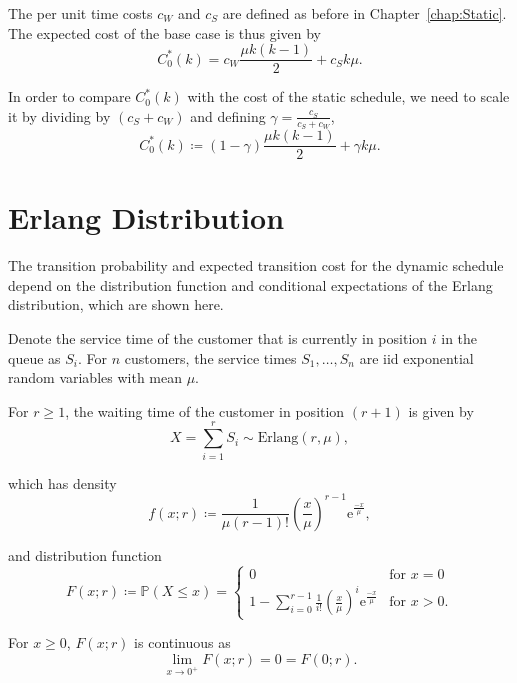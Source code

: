 The per unit time costs $c_{W}$ and $c_{S}$ are defined as before in Chapter~\ref{chap:Static}. The expected cost of the base case is thus given by
\begin{equation}
 	C_{0}^{*} (k) = c_{W} \frac{\mu k (k - 1)}{2} + c_{S} k \mu.
\end{equation}

In order to compare $C_{0}^{*} (k)$ with the cost of the static schedule, we need to scale it by dividing by $(c_{S} + c_{W})$ and defining $\gamma = \frac{c_{S}}{c_{S} + c_{W}}$,
\begin{equation}
	C_{0}^{*} (k) \coloneqq (1 - \gamma) \frac{\mu k (k - 1)}{2} + \gamma k \mu.
\end{equation}

\section{Erlang Distribution}
The transition probability and expected transition cost for the dynamic schedule depend on the distribution function and conditional expectations of the Erlang distribution, which are shown here.

Denote the service time of the customer that is currently in position $i$ in the queue as $S_{i}$. For $n$ customers, the service times $S_{1}, \ldots, S_{n}$ are iid exponential random variables with mean $\mu$.

For $r \geq 1$, the waiting time of the customer in position $(r + 1)$ is given by
\begin{equation}
	X = \sum_{i = 1}^{r} S_{i} \sim \text{Erlang}(r, \mu),
\end{equation}

which has density
\begin{equation}
	f (x; r) \coloneqq \frac{1}{\mu (r - 1)!} \left( \frac{x}{\mu} \right)^{r - 1} \mathrm{e}^{\frac{-x}{\mu}},
\end{equation}

and distribution function
\begin{equation}
	F (x; r) \coloneqq \mathbb{P} (X \leq x) = \begin{cases} 0 & \text{for $x = 0$} \\ 1 - \sum_{i = 0}^{r - 1} \frac{1}{i!} \left( \frac{x}{\mu} \right)^{i} \mathrm{e}^{\frac{-x}{\mu}} & \text{for $x > 0$}. \end{cases}
\end{equation}

For $x \geq 0$, $F (x; r)$ is continuous as
\begin{equation}
	\lim_{x \to 0^{+}} F (x; r) = 0 = F (0; r).
\end{equation}

